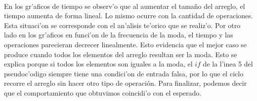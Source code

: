 \paragraph{}
En los gr'aficos de tiempo se observ'o que al aumentar el tama\~{n}o del arreglo, el tiempo 
aumenta de forma lineal. Lo mismo ocurre con la cantidad de operaciones. Esta situaci'on se 
corresponde con el an'alisis te'orico que se realiz'o. Por otro lado en los gr'aficos en funci'on 
de la frecuencia de la moda, el tiempo y las operaciones parecieran decrecer linealmente. Esto 
evidencia que el mejor caso se produce cuando todos los elementos del arreglo resultan ser la moda. Esto se
explica porque si todos los elementos son iguales a la moda, el $if$ de la l'inea 5 del pseudoc'odigo
siempre tiene una condici'on de entrada falsa, por lo que el ciclo recorre el arreglo sin 
hacer otro tipo de operación. Para finalizar, podemos decir que el comportamiento que obtuvimos coincidi'o con el esperado.
